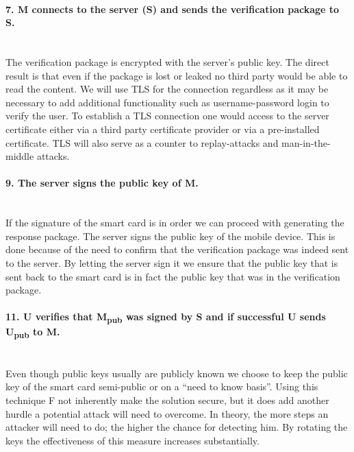 \paragraph{7. M connects to the server (S) and sends the verification package to S.}\mbox{}\\
The verification package is encrypted with the server's public key. The direct result is that even if the package is lost or leaked no third party would be able to read the content. We will use TLS for the connection regardless as it may be necessary to add additional functionality such as username-password login to verify the user. To establish a TLS connection one would access to the server certificate either via a third party certificate provider or via a pre-installed certificate. TLS will also serve as a counter to replay-attacks and man-in-the-middle attacks.

\paragraph{9. The server signs the public key of M.}\mbox{}\\
If the signature of the smart card is in order we can proceed with generating the response package. The server signs the public key of the mobile device. This is done because of the need to confirm that the verification package was indeed sent to the server. By letting the server sign it we ensure that the public key that is sent back to the smart card is in fact the public key that was in the verification package.

\paragraph{11. U verifies that M\textsubscript{pub} was signed by S and if successful U sends U\textsubscript{pub} to M.}\mbox{}\\
Even though public keys usually are publicly known we choose to keep the public key of the smart card semi-public or on a ``need to know basis''. Using this technique F not inherently make the solution secure, but it does add another hurdle a potential attack will need to overcome. In theory, the more steps an attacker will need to do; the higher the chance for detecting him. By rotating the keys the effectiveness of this measure increases substantially.


